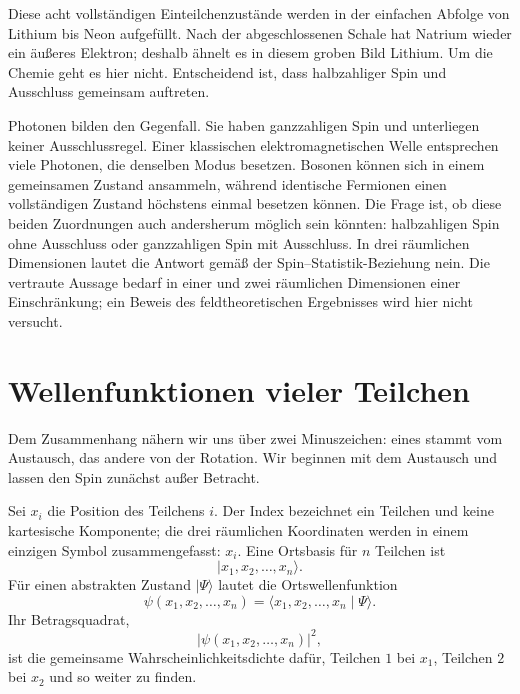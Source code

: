 Diese acht vollständigen Einteilchenzustände werden in der einfachen Abfolge von Lithium bis Neon aufgefüllt. Nach der abgeschlossenen Schale hat Natrium wieder ein äußeres Elektron; deshalb ähnelt es in diesem groben Bild Lithium. Um die Chemie geht es hier nicht. Entscheidend ist, dass halbzahliger Spin und Ausschluss gemeinsam auftreten.

Photonen bilden den Gegenfall. Sie haben ganzzahligen Spin und unterliegen keiner Ausschlussregel. Einer klassischen elektromagnetischen Welle entsprechen viele Photonen, die denselben Modus besetzen. Bosonen können sich in einem gemeinsamen Zustand ansammeln, während identische Fermionen einen vollständigen Zustand höchstens einmal besetzen können. Die Frage ist, ob diese beiden Zuordnungen auch andersherum möglich sein könnten: halbzahligen Spin ohne Ausschluss oder ganzzahligen Spin mit Ausschluss. In drei räumlichen Dimensionen lautet die Antwort gemäß der Spin--Statistik-Beziehung nein. Die vertraute Aussage bedarf in einer und zwei räumlichen Dimensionen einer Einschränkung; ein Beweis des feldtheoretischen Ergebnisses wird hier nicht versucht.

\begin{classroomqa}
\end{classroomqa}

\section{Wellenfunktionen vieler Teilchen}

Dem Zusammenhang nähern wir uns über zwei Minuszeichen: eines stammt vom Austausch, das andere von der Rotation. Wir beginnen mit dem Austausch und lassen den Spin zunächst außer Betracht.

Sei \(x_i\) die Position des Teilchens \(i\). Der Index bezeichnet ein Teilchen und keine kartesische Komponente; die drei räumlichen Koordinaten werden in einem einzigen Symbol zusammengefasst: \(x_i\). Eine Ortsbasis für \(n\) Teilchen ist
\begin{equation}
\lvert x_1,x_2,\ldots,x_n\rangle.
\end{equation}
Für einen abstrakten Zustand \(\lvert\Psi\rangle\) lautet die Ortswellenfunktion
\begin{equation}
\psi(x_1,x_2,\ldots,x_n)
=
\langle x_1,x_2,\ldots,x_n\mid\Psi\rangle.
\end{equation}
Ihr Betragsquadrat,
\begin{equation}
\bigl\lvert\psi(x_1,x_2,\ldots,x_n)\bigr\rvert^2,
\end{equation}
ist die gemeinsame Wahrscheinlichkeitsdichte dafür, Teilchen \(1\) bei \(x_1\), Teilchen \(2\) bei \(x_2\) und so weiter zu finden.

